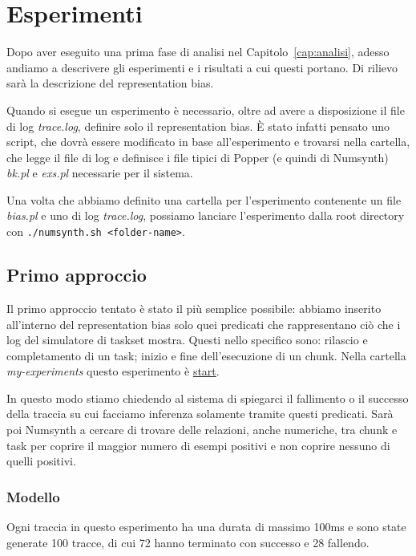 \chapter{Esperimenti}
\label{cap:esperimenti}
Dopo aver eseguito una prima fase di analisi nel Capitolo~\ref{cap:analisi}, adesso andiamo a descrivere gli esperimenti e i risultati a cui questi portano. Di rilievo sarà la descrizione del representation bias.

\myskip

Quando si esegue un esperimento è necessario, oltre ad avere a disposizione il file di log \textit{trace.log}, definire solo il representation bias. È stato infatti pensato uno script, che dovrà essere modificato in base all'esperimento e trovarsi nella cartella, che legge il file di log e definisce i file tipici di Popper (e quindi di Numsynth) \textit{bk.pl} e \textit{exs.pl} necessarie per il sistema.

Una volta che abbiamo definito una cartella per l'esperimento contenente un file \textit{bias.pl} e uno di log \textit{trace.log}, possiamo lanciare l'esperimento dalla root directory con \texttt{./numsynth.sh <folder-name>}.

\section{Primo approccio}
\label{sec:primo-approccio}
Il primo approccio tentato è stato il più semplice possibile: abbiamo inserito all'interno del representation bias solo quei predicati che rappresentano ciò che i log del simulatore di taskset mostra. Questi nello specifico sono: rilascio e completamento di un task; inizio e fine dell'esecuzione di un chunk. Nella cartella \textit{my-experiments} questo esperimento è \href{https://github.com/edoardosarri24/numsynth/tree/main/my-experiments/1-start/}{start}.

In questo modo stiamo chiedendo al sistema di spiegarci il fallimento o il successo della traccia su cui facciamo inferenza solamente tramite questi predicati. Sarà poi Numsynth a cercare di trovare delle relazioni, anche numeriche, tra chunk e task per coprire il maggior numero di esempi positivi e non coprire nessuno di quelli positivi.

\subsection{Modello}
\label{subsec:mod-primo-approccio}
Ogni traccia in questo esperimento ha una durata di massimo 100ms e sono state generate 100 tracce, di cui 72 hanno terminato con successo e 28 fallendo.

